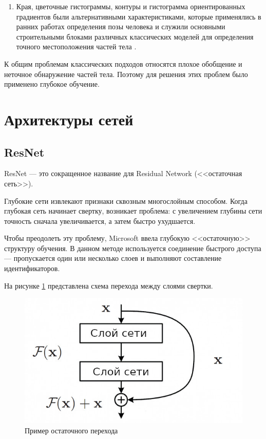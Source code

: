 \begin{enumerate}[label=\arabic*)]
\begin{itemize}
 				
 		\end{itemize}
 		
 		
 	\item Края, цветочные гистограммы, контуры и гистограмма ориентированных градиентов были альтернативными характеристиками, которые применялись в ранних работах определения позы человека и служили основными строительными блоками различных классических моделей для определения точного местоположения частей тела \cite{polygraphic}. 
\end{enumerate}

К общим проблемам классических подходов относятся плохое обобщение и неточное обнаружение частей тела. Поэтому для решения этих проблем было применено глубокое обучение.

\section{Архитектуры сетей}

\subsection{ResNet}

ResNet \cite{resnet} --- это сокращенное название для Residual Network (<<остаточная сеть>>).

Глубокие сети извлекают признаки сквозным многослойным способом. Когда глубокая сеть начинает свертку, возникает проблема: с увеличением глубины сети точность сначала увеличивается, а затем быстро ухудшается.

Чтобы преодолеть эту проблему, Microsoft ввела глубокую <<остаточную>> структуру обучения. В данном методе используется соединение быстрого доступа --- пропускается один или несколько слоев и выполняют составление идентификаторов.

На рисунке \ref{img:resnet-rus} представлена схема перехода между слоями свертки.

\begin{figure}[ht!]
	\centering
	\includegraphics[width=0.3\linewidth]{assets/resnet-rus.jpeg}
	\caption{Пример остаточного перехода}
	\label{img:resnet-rus}
\end{figure}
\FloatBarrier

